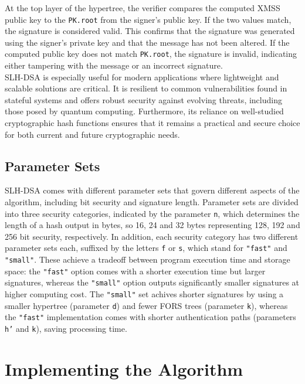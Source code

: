 \documentclass[journal=tosc,notanonymous]{iacrtrans}
\begin{document}
At the top layer of the hypertree, the verifier compares the computed XMSS public key to the \texttt{PK.root} from the signer's public key. If the two values match, the signature is considered valid. This confirms that the signature was generated using the signer's private key and that the message has not been altered. If the computed public key does not match \texttt{PK.root}, the signature is invalid, indicating either tampering with the message or an incorrect signature. \cite{national-institute-of-standards-and-technology-2024,wikipedia-contributors-2024}\\
\newline
SLH-DSA is especially useful for modern applications where lightweight and scalable solutions are critical. It is resilient to common vulnerabilities found in stateful systems and offers robust security against evolving threats, including those posed by quantum computing. Furthermore, its reliance on well-studied cryptographic hash functions ensures that it remains a practical and secure choice for both current and future cryptographic needs.

\subsection{Parameter Sets}

SLH-DSA comes with different parameter sets that govern different aspects of the algorithm, including bit security and signature length.
Parameter sets are divided into three security categories, indicated by the parameter \texttt{n}, which determines the length of a hash output in bytes, so 16, 24 and 32 bytes representing 128, 192 and 256 bit security, respectively.
In addition, each security category has two different parameter sets each, suffixed by the letters \texttt{f} or \texttt{s}, which stand for \texttt{"fast"} and \texttt{"small"}.
These achieve a tradeoff between program execution time and storage space: the \texttt{"fast"} option comes with a shorter execution time but larger signatures, whereas the \texttt{"small"} option outputs significantly smaller signatures at higher computing cost.
The \texttt{"small"} set achives shorter signatures by using a smaller hypertree (parameter \texttt{d}) and fewer FORS trees (parameter \texttt{k}), whereas the \texttt{"fast"} implementation comes with shorter authentication paths (parameters \texttt{h'} and \texttt{k}), saving processing time.


\section{Implementing the Algorithm}
\end{document}
